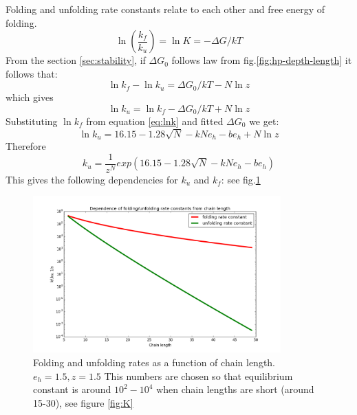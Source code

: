 \documentclass[12pt]{paper}
\newcommand{\gD}{\Delta}
\newcommand{\pt}[1]{\left( #1\right)}
\begin{document}
Folding and unfolding rate constants relate to each other and free energy of folding.
\begin{equation}
 \ln\pt{\frac{k_f}{k_u}}=\ln K=-\gD G/kT
\end{equation} 
From the section \ref{sec:stability}, if $\gD G_0$ follows law from fig.\ref{fig:hp-depth-length}  
it follows that:
\begin{equation}
\ln k_f-\ln k_u=\gD G_0/kT-N\ln z%
\end{equation} 
which gives
\begin{equation}
\ln k_u = \ln k_f -\gD G_0/kT+N\ln z 
\end{equation} 
Substituting $\ln k_f $ from equation \eqref{eq:lnk} and fitted $\gD G_0$ we get:
\begin{equation}
\ln k_u = 16.15-1.28 \sqrt{N} -kNe_h -be_h+N\ln z
\end{equation} 
Therefore
\begin{equation}
k_u = \frac{1}{z^N}exp(16.15-1.28 \sqrt{N} -kNe_h -be_h)
\end{equation} 
This gives the following dependencies for $k_u$ and $k_f$: see fig.\ref{fig:k_unf_N}
\begin{figure}[h!]
  \centering
  \includegraphics[width=0.85\textwidth]{pictures/kf-ku.png} 
  \caption{Folding and unfolding rates as a function of chain length. $e_h=1.5,z=1.5$ This numbers 
are chosen so that equilibrium constant is around $10^2-10^4$ when chain lengths are short (around 
15-30), see figure \ref{fig:K}}
  \label{fig:k_unf_N}
\end{figure}
\end{document}
